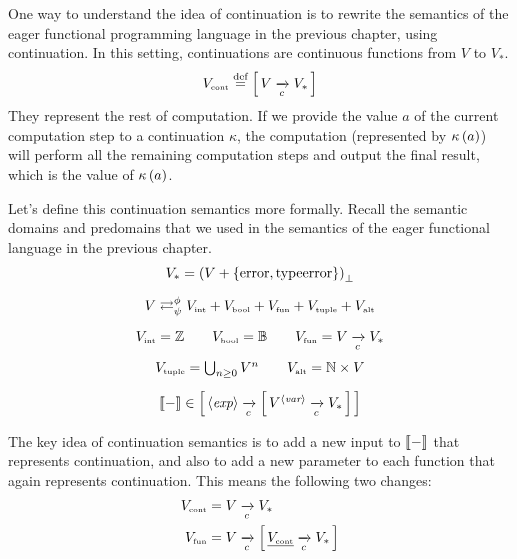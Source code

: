 \begin{enumcirc}
	\item
	One way to understand the idea of continuation is to rewrite the semantics of
	the eager functional programming language in the previous chapter, using
	continuation.
	In this setting, continuations are continuous functions from $V$ to $V_*$.
	\[
		V_{\textrm{\tiny cont}} \stackrel{\text{def}}{=} \left[ \, V \xrightarrow[c]{} V_* \, \right]
	\]
	They represent the rest of computation.
	If we provide the value $a$ of the current computation step to a continuation
	$\kappa$, the computation (represented by $\kappa\left( a \right)$) will perform all
	the remaining computation steps and output the final result, which is the value
	of $\kappa\left( a \right)$.
	\item
	Let's define this continuation semantics more formally.
	Recall the semantic domains and predomains that we used in the semantics of the
	eager functional language in the previous chapter.
	\[
		\begin{array}{c}
			V_*                  =
			\left( V + \left\{ \textrm{error}, \textrm{typeerror} \right\} \right)_\bot                                              \\[1em]
			V                    \mathrel{\mathop{\rightleftarrows}^{\mathrm{\phi}}_{\mathrm{\psi}}}
			V_{\textrm{\tiny int}} + V_{\textrm{\tiny bool}} + V_{\textrm{\tiny fun}} + V_{\textrm{\tiny tuple}} + V_{\textrm{\tiny alt}} \\[1em]
			V_{\textrm{\tiny int}}   =
			\mathbb{Z} \qquad
			V_{\textrm{\tiny bool}}  =
			\mathbb{B} \qquad
			V_{\textrm{\tiny fun}}   =
			V \xrightarrow[c]{} V_*                                                                                                \\[1em]
			V_{\textrm{\tiny tuple}} = \bigcup_{n \ge 0} V^n \qquad V_{\textrm{\tiny alt}} = \mathbb{N} \times V                      \\[1em]
			\left\llbracket - \right\rrbracket        \in \left[ \, \left\langle \textit{exp} \right\rangle \xrightarrow[c]{} \left[ \, V^{\left\langle \textit{var} \right\rangle} \xrightarrow[c]{} V_* \, \right] \, \right]
		\end{array}
	\]
	\item
	The key idea of continuation semantics is to add a new input to $\left\llbracket - \right\rrbracket$
	that represents continuation, and also to add a new parameter to each function
	that again represents continuation.
	This means the following two changes:
	\begin{align*}
		\subsctext{V}{cont} & = V \toc V_*                                                 \\
		\subsctext{V}{fun}  & = V \toc \brackets{\underline{\subsctext{V}{cont}} \toc V_*} \\

\end{align*}
\end{enumcirc}
